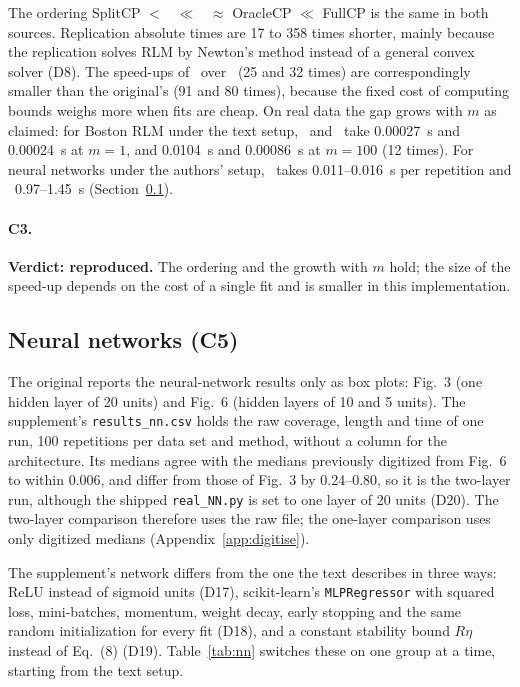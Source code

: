 The ordering SplitCP $<$ \LOO\ $\ll$ \RO\ $\approx$ OracleCP $\ll$ FullCP is the same in both sources. Replication absolute
times are 17 to 358 times shorter, mainly because the replication solves RLM by Newton's method instead of a general convex solver
(D8). The speed-ups of \LOO\ over \RO\ (25 and 32 times) are correspondingly smaller than the original's (91 and 80
times), because the fixed cost of computing bounds weighs more when fits are cheap. On real data the gap grows with
$m$ as claimed: for Boston RLM under the text setup, \RO\ and \LOO\ take 0.00027~s and 0.00024~s at $m=1$, and
0.0104~s and 0.00086~s at $m=100$ (12 times). For neural networks under the authors' setup, \LOO\ takes 0.011--0.016~s
per repetition and \RO\ 0.97--1.45~s (Section~\ref{sec:nn}).

\paragraph{C3.} \textbf{Verdict: reproduced.} The ordering and the growth with $m$ hold; the size of the speed-up
depends on the cost of a single fit and is smaller in this implementation.

\subsection{Neural networks (C5)}
\label{sec:nn}

The original reports the neural-network results only as box plots: Fig.~3 (one hidden layer of 20 units) and Fig.~6
(hidden layers of 10 and 5 units). The supplement's \texttt{results\_nn.csv} holds the raw coverage, length and time of
one run, 100 repetitions per data set and method, without a column for the architecture. Its medians agree with the
medians previously digitized from Fig.~6 to within 0.006, and differ from those of Fig.~3 by 0.24--0.80, so it is the
two-layer run, although the shipped \texttt{real\_NN.py} is set to one layer of 20 units (D20). The two-layer comparison therefore uses the raw file; the one-layer comparison uses only digitized medians (Appendix~\ref{app:digitise}).

The supplement's network differs from the one the text describes in three ways: ReLU instead of sigmoid units (D17),
scikit-learn's \texttt{MLPRegressor} with squared loss, mini-batches, momentum, weight decay, early stopping and the
same random initialization for every fit (D18), and a constant stability bound $R\eta$ instead of Eq.~(8) (D19).
Table~\ref{tab:nn} switches these on one group at a time, starting from the text setup.


